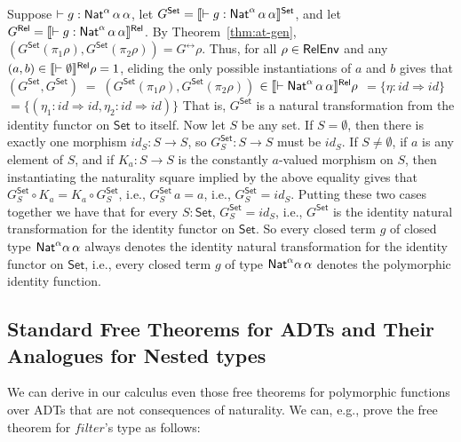 \documentclass[runningheads]{llncs}
\newcommand{\set}{\mathsf{Set}}
\renewcommand{\id}{\mathit{id}}
\renewcommand{\id}{\mathit{id}}
\begin{document}
Suppose $ \vdash g : \mathsf{Nat}^\alpha \,\alpha\,\alpha$, let $G^\set =
\setsem{\vdash g : \Nat^\alpha \,\alpha\,\alpha}$, and let $G^{\mathsf{Rel}} =
\llbracket{\vdash g : \mathsf{Nat}^\alpha \,\alpha\,\alpha}\rrbracket^{\mathsf{Rel}}$.  By
Theorem~\ref{thm:at-gen}, $(G^\set(\pi_1\rho),G^\set(\pi_2\rho))
= G^\rel\rho$. Thus, for all $\rho \in \mathsf{RelEnv}$ and any $(a, b) \in
\llbracket{\vdash \emptyset}\rrbracket^{\mathsf{Rel}}\rho = 1$, eliding the only possible
instantiations of $a$ and $b$ gives that
$(G^\set, G^\set) \; = \; (G^\set(\pi_1 \rho), G^\set (\pi_2 \rho))$
$ \in \llbracket{\vdash \mathsf{Nat}^\alpha \,\alpha\,\alpha}\rrbracket^{\mathsf{Rel}}\rho$
$ =  \{\eta : \id \Rightarrow \id\}$
$ =  \{(\eta_1 : \id \Rightarrow \id, \eta_2 : \id \Rightarrow
\id)\}$
That is, $G^\set$ is a natural transformation from the identity
functor on $\set$ to itself. Now let $S$ be any set.  If $S =
\emptyset$, then there is exactly one morphism $\id_S: S \to S$, so
$G^\set_S : S \to S$ must be $\id_S$. If $S \not = \emptyset$, if
$a$ is any element of $S$, and if $K_a :S \to S$ is the constantly
$a$-valued morphism on $S$, then instantiating the naturality square
implied by the above equality gives that $G^\set_S \circ K_a = K_a
\circ G^\set_S$, i.e., $G^\set_S \, a = a$, i.e., $G^\set_S = \id_S$.
Putting these two cases together we have that for every $S : \set$,
$G^\set_S = \id_S$, i.e., $G^\set$ is the identity natural
transformation for the identity functor on $\set$. So every closed
term $g$ of closed type $\mathsf{Nat}^\alpha\alpha\,\alpha$ always denotes the
identity natural transformation for the identity functor on $\set$,
i.e., every closed term $g$ of type $\mathsf{Nat}^\alpha\alpha\,\alpha$
denotes the polymorphic identity function.

\subsection{Standard Free Theorems for ADTs and Their Analogues for
  Nested types}\label{sec:ft-adt}

We can derive in our calculus even those free theorems for polymorphic
functions over ADTs that are not consequences of naturality.  We can,
e.g., prove the free theorem for $\mathit{filter}$'s type as follows:

\end{document}
